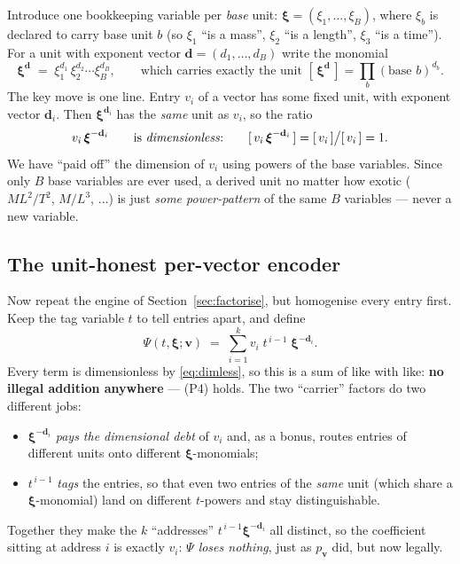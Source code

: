 \documentclass[11pt,a4paper]{article}
\theoremstyle{definition}
\theoremstyle{plain}
\newcommand{\bvec}[1]{\mathbf{#1}}
\newcommand{\units}[1]{[\,#1\,]}   %
\begin{document}
Introduce one bookkeeping variable per \emph{base} unit:
$\boldsymbol\xi=(\xi_1,\dots,\xi_B)$, where $\xi_b$ is declared to carry base unit
$b$ (so $\xi_1$ ``is a mass'', $\xi_2$ ``is a length'', $\xi_3$ ``is a time''). For
a unit with exponent vector $\bvec d=(d_1,\dots,d_B)$ write the monomial
\[
   \boldsymbol\xi^{\bvec d}\;=\;\xi_1^{d_1}\,\xi_2^{d_2}\cdots\xi_B^{d_B},
   \qquad\text{which carries exactly the unit }\units{\boldsymbol\xi^{\bvec d}}
   =\prod_b(\text{base }b)^{d_b}.
\]
The key move is one line. Entry $v_i$ of a vector has some fixed unit, with
exponent vector $\bvec d_i$. Then $\boldsymbol\xi^{\bvec d_i}$ has the \emph{same}
unit as $v_i$, so the ratio
\begin{equation}\label{eq:dimless}
   v_i\,\boldsymbol\xi^{-\bvec d_i}\qquad\text{is \emph{dimensionless}:}\qquad
   \units{v_i\,\boldsymbol\xi^{-\bvec d_i}}=\units{v_i}\big/\units{v_i}=1 .
\end{equation}
We have ``paid off'' the dimension of $v_i$ using powers of the base variables.
Since only $B$ base variables are ever used, a derived unit no matter how exotic
($M L^2/T^2$, $M/L^3$, $\ldots$) is just \emph{some power-pattern} of the same $B$
variables --- never a new variable.

\subsection{The unit-honest per-vector encoder}

Now repeat the engine of Section~\ref{sec:factorise}, but homogenise every entry
first. Keep the tag variable $t$ to tell entries apart, and define
\begin{equation}\label{eq:Psi}
   \Psi(t,\boldsymbol\xi;\bvec v)\;=\;\sum_{i=1}^{k}
        v_i\;t^{\,i-1}\;\boldsymbol\xi^{-\bvec d_i}.
\end{equation}
Every term is dimensionless by \eqref{eq:dimless}, so this is a sum of like with
like: \textbf{no illegal addition anywhere} --- (P4) holds. The two ``carrier''
factors do two different jobs:
\begin{itemize}[leftmargin=*]
\item $\boldsymbol\xi^{-\bvec d_i}$ \emph{pays the dimensional debt} of $v_i$ and, as
      a bonus, routes entries of different units onto different
      $\boldsymbol\xi$-monomials;
\item $t^{\,i-1}$ \emph{tags} the entries, so that even two entries of the
      \emph{same} unit (which share a $\boldsymbol\xi$-monomial) land on different
      $t$-powers and stay distinguishable.
\end{itemize}
Together they make the $k$ ``addresses'' $t^{\,i-1}\boldsymbol\xi^{-\bvec d_i}$ all
distinct, so the coefficient sitting at address $i$ is exactly $v_i$: \emph{$\Psi$
loses nothing}, just as $p_{\bvec v}$ did, but now legally.
\end{document}
